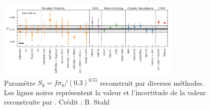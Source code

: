 \documentclass{book}
\begin{document}
\begin{figure}
    \centering
    \includegraphics[width=0.8\textwidth]{figures/Stahl_fig_6.png}
    \caption{Paramètre $S_8 = f \sigma_8/(0.3)^{0.55}$ reconstruit par diverses méthodes. Les lignes noires représentent la valeur et l'incertitude de la valeur reconstruite par \cite{stahl_peculiar-velocity_2021}. Crédit : B. Stahl}
    \label{fig:stahl}
\end{figure}


\printbibliography
\end{document}
